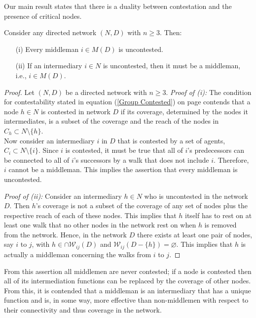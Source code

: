 Our main result states that there is a duality between contestation and the presence of critical nodes.
\begin{theorem} \label{duality}
Consider any directed network $(N,D)$ with $n \geqslant 3$. Then:
\begin{itemize}
\item[(i)] Every middleman $i \in M(D)$ is uncontested.

\item[(ii)] If an intermediary $i \in N$ is uncontested, then it must be a middleman, i.e., $i \in M(D)$.
\end{itemize}
\end{theorem}
\begin{proof}
Let $(N,D)$ be a directed network with $n \geqslant 3$.
\smallskip\noindent
\emph{Proof of (i):}
The condition for contestability stated in equation (\ref{Group Contested}) on page \pageref{Group Contested} contends that a node $h \in N$ is contested in network $D$ if its coverage, determined by the nodes it intermediates, is a subset of the coverage and the reach of the nodes in $C_{h} \subset N \setminus \{ h \}$.
\\
Now consider an intermediary $i$ in $D$ that is contested by a set of agents, $C_{i} \subset N \setminus \{ i \}$. Since $i$ is contested, it must be true that all of $i$'s predecessors can be connected to all of $i$'s successors by a walk that does not include $i$. Therefore, $i$ cannot be a middleman. This implies the assertion that every middleman is uncontested.

\smallskip\noindent
\emph{Proof of (ii):}
Consider an intermediary $h \in N$ who is uncontested in the network $D$. Then $h$'s coverage is not a subset of the coverage of any set of nodes plus the respective reach of each of these nodes. This implies that $h$ itself has to rest on at least one walk that no other nodes in the network rest on when $h$ is removed from the network. Hence, in the network $D$ there exists at least one pair of nodes, say $i$ to $j$, with $h \in \cap \mathcal{W}_{ij} (D)$ and $\mathcal{W}_{ij}(D - \{h\}) = \varnothing$. This implies that $h$ is actually a middleman concerning the walks from $i$ to $j$.
\end{proof}

\medskip\noindent
From this assertion all middlemen are never contested; if a node is contested then all of its intermediation functions can be replaced by the coverage of other nodes. From this, it is contended that a middleman is an intermediary that has a unique function and is, in some way, more effective than non-middlemen with respect to their connectivity and thus coverage in the network.


